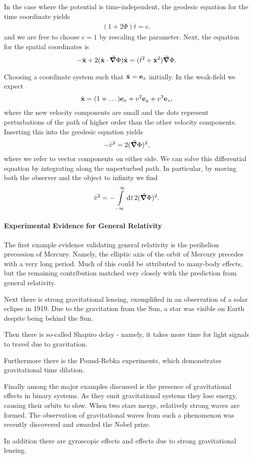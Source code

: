 In the case where the potential is time-independent, the geodesic equation for the time coordinate yields
\begin{align*}
	(1 + 2\Phi)\dot{t} = c,
\end{align*}
and we are free to choose $c = 1$ by rescaling the parameter. Next, the equation for the spatial coordinates is
\begin{align*}
	-\ddot{\vb{x}} + 2(\dot{\vb{x}}\cdot\grad{\Phi})\dot{\vb{x}} = (\dot{t}^{2} + \dot{\vb{x}}^{2})\grad{\Phi}.
\end{align*}

Choosing a coordinate system such that $\dot{\vb{x}} = \vb{e}_{x}$ initially. In the weak-field we expect
\begin{align*}
	\dot{\vb{x}} = (1 + \dots)\vb{e}_{x} + v^{2}\vb{e}_{y} + v^{3}\vb{e}_{z},
\end{align*}
where the new velocity components are small and the dots represent perturbations of the path of higher order than the other velocity components. Inserting this into the geodesic equation yields
\begin{align*}
	-\dot{v}^{2} = 2(\grad{\Phi})^{2},
\end{align*}
where we refer to vector components on either side. We can solve this differential equation by integrating along the unperturbed path. In particular, by moving both the observer and the object to infinity we find
\begin{align*}
	\dot{v}^{2} = -\int\limits_{-\infty}^{\infty}\dd[]{t}2(\grad{\Phi})^{2}.
\end{align*}

\paragraph{Experimental Evidence for General Relativity}
The first example evidence validating general relativity is the perihelion precession of Mercury. Namely, the elliptic axis of the orbit of Mercury precedes with a very long period. Much of this could be attributed to many-body effects, but the remaining contribution matched very closely with the prediction from general relativity.

Next there is strong gravitational lensing, exemplified in an observation of a solar eclipse in 1919. Due to the gravitation from the Sun, a star was visible on Earth despite being behind the Sun.

Then there is so-called Shapiro delay - namely, it takes more time for light signals to travel due to gravitation.

Furthermore there is the Pound-Rebka experiments, which demonstrates gravitational time dilation.

Finally among the major examples discussed is the presence of gravitational effects in binary systems. As they emit gravitational systems they lose energy, causing their orbits to slow. When two stars merge, relatively strong waves are formed. The observation of gravitational waves from such a phenomenon was recently discovered and awarded the Nobel prize.

In addition there are gyroscopic effects and effects due to strong gravitational lensing.